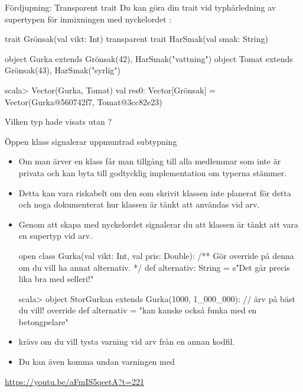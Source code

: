         
  

\begin{Slide}{Fördjupning: Transparent trait}\SlideFontSmall
Du kan göra din trait  vid typhärledning av supertypen för inmixningen med nyckelordet :
\begin{Code}
trait Grönsak(val vikt: Int)
transparent trait HarSmak(val smak: String)

object Gurka extends Grönsak(42), HarSmak("vattning")
object Tomat extends Grönsak(43), HarSmak("syrlig")
\end{Code} 
\begin{REPLnonum}
scala> Vector(Gurka, Tomat)
val res0: Vector[Grönsak] = 
  Vector(Gurka@560742f7, Tomat@3cc82e23)
\end{REPLnonum}
Vilken typ hade visats utan ? \pause \\ 
\end{Slide}


\begin{Slide}{Öppen klass signalerar uppmuntrad subtypning}\SlideFontSmall
\begin{itemize}
\item Om man ärver en klass får man tillgång till alla medlemmar som inte är privata och kan byta till godtycklig implementation om typerna stämmer.
\item Detta kan vara riskabelt om den som skrivit klassen inte planerat för detta och noga dokumenterat hur klassen är tänkt att användas vid arv. 
\item Genom att skapa  med nyckelordet  signalerar du att klassen är tänkt att vara en supertyp vid arv.
\begin{Code}
open class Gurka(val vikt: Int, val pris: Double):
  /** Gör override på denna om du vill ha annat alternativ. */
  def alternativ: String = s"Det går precis lika bra med selleri!"  
\end{Code}
\begin{REPLsmall}
scala> object StorGurkan extends Gurka(1000, 1_000_000): // ärv på bäst du vill!
         override def alternativ = "kan kanske också funka med en betongpelare"
\end{REPLsmall}
\item {} krävs om du vill tysta varning vid arv från en annan kodfil.
\item Du kan även komma undan varningen med  
\end{itemize}  

\url{https://youtu.be/aFmIS5qeetA?t=221}
\end{Slide}


